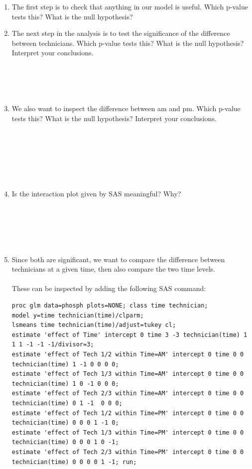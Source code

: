 \begin{enumerate}
\item The first step is to check that anything in our model is useful.  Which p-value tests this? What is the null hypothesis?

\newpage

\item The next step in the analysis is to test the significance of the difference between technicians.  Which p-value tests this?  What is the null hypothesis?  Interpret your conclusions.\\~\\~\\~\\~\\

\item We also want to inspect the difference between am and pm.  Which p-value tests this?  What is the null hypothesis?  Interpret your conclusions.\\~\\~\\~\\~\\~\\~\\

\item Is the interaction plot given by SAS meaningful?  Why?\\~\\~\\~\\~\\~\\

\item Since both are significant, we want to compare the difference between technicians at a given time, then also compare the two time levels.  \\~\\
These can be inspected by adding the following SAS command:\\
\begin{small}
\begin{verbatim}
proc glm data=phosph plots=NONE; class time technician;
model y=time technician(time)/clparm;
lsmeans time technician(time)/adjust=tukey cl;
estimate 'effect of Time' intercept 0 time 3 -3 technician(time) 1 1 1 -1 -1 -1/divisor=3; 
estimate 'effect of Tech 1/2 within Time=AM' intercept 0 time 0 0 technician(time) 1 -1 0 0 0 0;
estimate 'effect of Tech 1/3 within Time=AM' intercept 0 time 0 0 technician(time) 1 0 -1 0 0 0;
estimate 'effect of Tech 2/3 within Time=AM' intercept 0 time 0 0 technician(time) 0 1 -1  0 0 0;
estimate 'effect of Tech 1/2 within Time=PM' intercept 0 time 0 0 technician(time) 0 0 0 1 -1 0;
estimate 'effect of Tech 1/3 within Time=PM' intercept 0 time 0 0 technician(time) 0 0 0 1 0 -1;
estimate 'effect of Tech 2/3 within Time=PM' intercept 0 time 0 0 technician(time) 0 0 0 0 1 -1; run;
\end{verbatim}
\end{small}


\end{enumerate}
